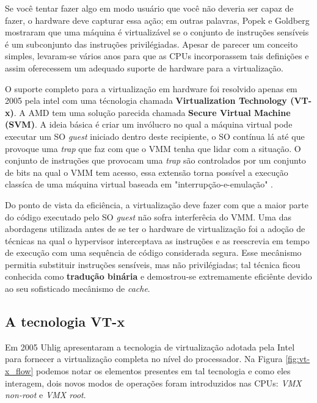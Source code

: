 Se você tentar fazer algo em modo usuário que você não deveria ser capaz de
fazer, o hardware deve capturar essa ação; em outras palavras, Popek e Goldberg
mostraram que uma máquina é virtualizável se o conjunto de instruções sensíveis
é um subconjunto das instruções privilégiadas. Apesar de parecer um conceito
simples, levaram-se vários anos para que as CPUs incorporassem tais definições
e assim oferecessem um adequado suporte de hardware para a virtualização.

O suporte completo para a virtualização em hardware foi resolvido apenas em
2005 pela intel \cite{uhlig} com uma técnologia chamada \textbf{Virtualization
Technology (VT-x)}. A AMD tem uma solução parecida chamada \textbf{Secure
Virtual Machine (SVM)}. A ideia básica é criar um invólucro no qual a máquina
virtual pode executar um SO \emph{guest} iniciado dentro deste recipiente, o SO
contínua lá até que provoque uma \emph{trap} que faz com que o VMM tenha que
lidar com a situação. O conjunto de instruções que provocam uma \emph{trap} são
controlados por um conjunto de bits na qual o VMM tem acesso, essa extensão
torna possível a execução classíca de uma máquina virtual baseada em
"interrupção-e-emulação" \cite{tanenbaum}.

Do ponto de vista da eficiência, a virtualização deve fazer com que a maior
parte do código executado pelo SO \emph{guest} não sofra interferêcia do VMM.
Uma das abordagens utilizada antes de se ter o hardware de virtualização foi a
adoção de técnicas na qual o hypervisor interceptava as instruções e as
reescrevia em tempo de execução com uma sequência de código considerada segura.
Esse mecânismo permitia substituir instruções sensíveis, mas não privilégiadas;
tal técnica ficou conhecida como \textbf{tradução binária} e demostrou-se
extremamente eficiênte devido ao seu sofisticado mecânismo de \emph{cache}.


\subsection{A tecnologia VT-x}
\label{sec:vtx}

Em 2005 Uhlig \citep{uhlig} apresentaram a tecnologia de virtualização adotada
pela Intel para fornecer a virtualização completa no nível do processador. Na
Figura \ref{fig:vt-x_flow} podemos notar os elementos presentes em tal
tecnologia e como eles interagem, dois novos modos de operações foram
introduzidos nas CPUs: \emph{VMX non-root} e \emph{VMX root}.

